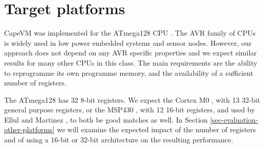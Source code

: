 \section{Target platforms}
CapeVM was implemented for the ATmega128 CPU \cite{Atmel:ATmega128Datasheet}. The AVR family of CPUs is widely used in low power embedded systems and sensor nodes. However, our approach does not depend on any AVR specific properties and we expect similar results for many other CPUs in this class. The main requirements are the ability to reprogramme its own programme memory, and the availability of a sufficient number of registers.

The ATmega128 has 32 8-bit registers. We expect the Cortex M0 \cite{ARM:2009vz}, with 13 32-bit general purpose registers, or the MSP430 \cite{TexasInstrumentsIncorporated:MSP430F1611Datasheet}, with 12 16-bit registers, and used by Ellul and Martinez \cite{Ellul:2010iw}, to both be good matches as well. In Section \ref{sec-evaluation-other-platforms} we will examine the expected impact of the number of registers and of using a 16-bit or 32-bit architecture on the resulting performance.
